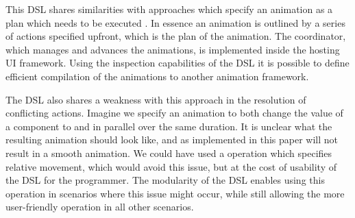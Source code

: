 This DSL shares similarities with approaches which specify an animation as a plan which needs to be executed \cite{DBLP:conf/chi/KurlanderL95} \cite{DBLP:conf/eics/MirlacherPB12}. In essence an animation is outlined by a series of actions specified upfront, which is the plan of the animation. The coordinator, which manages and advances the animations, is implemented inside the hosting UI framework. Using the inspection capabilities of the DSL it is possible to define efficient compilation of the animations to another animation framework.

The DSL also shares a weakness with this approach in the resolution of conflicting actions. Imagine we specify an animation to both change the  value of a component to  and  in parallel over the same duration. It is unclear what the resulting animation should look like, and as implemented in this paper will not result in a smooth animation. We could have used a  operation which specifies relative movement, which would avoid this issue, but at the cost of usability of the DSL for the programmer. The modularity of the DSL enables using this operation in scenarios where this issue might occur, while still allowing the more user-friendly operation in all other scenarios.
